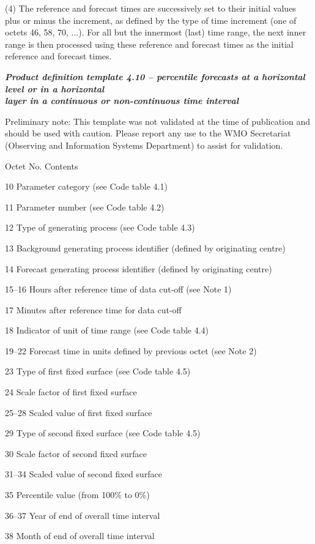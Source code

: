 (4) The reference and forecast times are successively set to their initial values plus or minus the increment, as defined by the type of time increment (one of octets 46, 58, 70, ...). For all but the innermost (last) time range, the next inner range is then processed using these reference and forecast times as the initial reference and forecast times.

\emph{\textbf{Product definition template 4.10 -- percentile forecasts at a horizontal level or in a horizontal\\
layer in a continuous or non-continuous time interval}}

Preliminary note: This template was not validated at the time of publication and should be used with caution. Please report any use to the WMO Secretariat (Observing and Information Systems Department) to assist for validation.

Octet No. Contents

10 Parameter category (see Code table 4.1)

11 Parameter number (see Code table 4.2)

12 Type of generating process (see Code table 4.3)

13 Background generating process identifier (defined by originating centre)

14 Forecast generating process identifier (defined by originating centre)

15--16 Hours after reference time of data cut-off (see Note 1)

17 Minutes after reference time for data cut-off

18 Indicator of unit of time range (see Code table 4.4)

19--22 Forecast time in units defined by previous octet (see Note 2)

23 Type of first fixed surface (see Code table 4.5)

24 Scale factor of first fixed surface

25--28 Scaled value of first fixed surface

29 Type of second fixed surface (see Code table 4.5)

30 Scale factor of second fixed surface

31--34 Scaled value of second fixed surface

35 Percentile value (from 100\% to 0\%)

36--37 Year of end of overall time interval

38 Month of end of overall time interval

